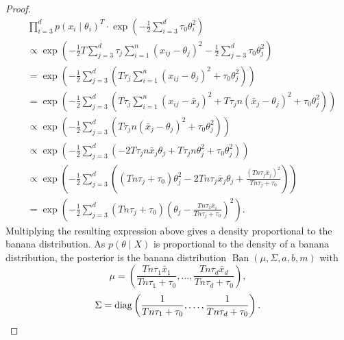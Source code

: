 \documentclass[english,twoside,openright]{HYgraduMLDS}
\DeclareMathOperator{\ban}{Ban}
\DeclareMathOperator{\diag}{diag}
\DeclareMathOperator{\clip}{clip}
\begin{document}
\begin{appendices}
\begin{proof}
\begin{align*}
    &\prod_{i=3}^d p(x_i\mid \theta_i)^T
      \cdot \exp\left(-\frac{1}{2}\sum_{i=3}^d \tau_0\theta_i^2\right)
    \\&\propto \exp\left(-\frac{1}{2}T\sum_{j=3}^d\tau_j\sum_{i=1}^n (x_{ij} - \theta_j)^2
    - \frac{1}{2}\sum_{j=3}^d\tau_0\theta_j^2\right)
    \\&= \exp\left(-\frac{1}{2}\sum_{j=3}^d\left(T\tau_j\sum_{i=1}^n (x_{ij} - \theta_j)^2
    + \tau_0\theta_j^2\right)\right)
    \\&= \exp\left(-\frac{1}{2}\sum_{j=3}^d\left(T\tau_j\sum_{i=1}^n (x_{ij} - \bar{x}_j)^2
    + T\tau_j n(\bar{x}_j - \theta_j)^2 + \tau_0\theta_j^2\right)\right)
    \\&\propto \exp\left(-\frac{1}{2}\sum_{j=3}^d\left(T\tau_j n(\bar{x}_j - \theta_j)^2
    + \tau_0\theta_j^2\right)\right)
    \\&\propto \exp\left(-\frac{1}{2}\sum_{j=3}^d\left(
    -2T\tau_j n\bar{x}_j\theta_j + T\tau_jn\theta_j^2
    + \tau_0\theta_j^2\right)\right)
    \\&\propto \exp\left(-\frac{1}{2}\sum_{j=3}^d\left(
    (Tn\tau_j + \tau_0)\theta_j^2
    - 2Tn\tau_j\bar{x}_j\theta_j + \frac{(Tn\tau_j\bar{x}_j)^2}{Tn\tau_j + \tau_0}\right)\right)
    \\&= \exp\left(-\frac{1}{2}\sum_{j=3}^d (Tn\tau_j + \tau_0)\left(\theta_j
    - \frac{Tn\tau_1\bar{x}_i}{Tn\tau_j + \tau_0}\right)^2\right).
  \end{align*}
  Multiplying the resulting expression above gives a density proportional
  to the banana distribution.
  As \(p(\theta\mid X)\) is proportional to the density of a
  banana distribution, the posterior is the banana distribution
  \(\ban(\mu, \Sigma, a, b, m)\)
  with
  \[
    \mu = \left(\frac{Tn\tau_1\bar{x}_1}{Tn\tau_1 + \tau_0},\dotsc,
      \frac{Tn\tau_d\bar{x}_d}{Tn\tau_d + \tau_0}\right),
  \]
  \[
    \Sigma = \diag\left(
      \frac{1}{Tn\tau_1 + \tau_0},\dotsc,
      \frac{1}{Tn\tau_d + \tau_0}
    \right).
    \qedhere
  \]
\end{proof}
\setcounter{lemma}{\value{temp_counter}}
\setcounter{chapter}{\value{temp_counter_chap}}




\end{appendices}
\end{document}
